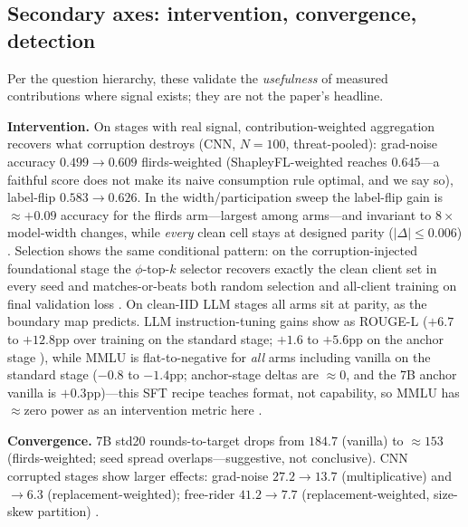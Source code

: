 \subsection{Secondary axes: intervention, convergence, detection}
\label{sec:results-secondary}

Per the question hierarchy, these validate the \emph{usefulness} of measured
contributions where signal exists; they are not the paper's headline.

\textbf{Intervention.} On stages with real signal, contribution-weighted
aggregation recovers what corruption destroys (CNN, $N{=}100$, threat-pooled):
grad-noise accuracy $0.499 \to 0.609$ flirds-weighted (ShapleyFL-weighted
reaches $0.645$---a faithful score does not make its naive consumption rule
optimal, and we say so), label-flip $0.583 \to 0.626$. In the
width/participation sweep the label-flip gain is $\approx$$+0.09$ accuracy for
the flirds arm---largest among arms---and invariant to $8\times$ model-width
changes, while \emph{every} clean cell stays at designed parity
($|\Delta| \le 0.006$) . Selection shows the
same conditional pattern: on the corruption-injected foundational stage the
$\phi$-top-$k$ selector recovers exactly the clean client set in every seed
and matches-or-beats both random selection and all-client training on final
validation loss . On clean-IID LLM
stages all arms sit at parity, as the boundary map predicts. LLM
instruction-tuning gains show as ROUGE-L ($+6.7$ to $+12.8$pp over training on
the standard stage; $+1.6$ to $+5.6$pp on the anchor stage ), while MMLU is flat-to-negative for \emph{all} arms including
vanilla on the standard stage ($-0.8$ to $-1.4$pp; anchor-stage deltas are
$\approx 0$, and the 7B anchor vanilla is $+0.3$pp)---this SFT recipe teaches
format, not capability, so MMLU has $\approx$zero power as an intervention
metric here .

\textbf{Convergence.} 7B std20 rounds-to-target drops from $184.7$ (vanilla) to
$\approx 153$ (flirds-weighted; seed spread overlaps---suggestive, not
conclusive). CNN corrupted stages show larger effects: grad-noise $27.2 \to
13.7$ (multiplicative) and $\to 6.3$ (replacement-weighted); free-rider
$41.2 \to 7.7$ (replacement-weighted, size-skew partition)
.

